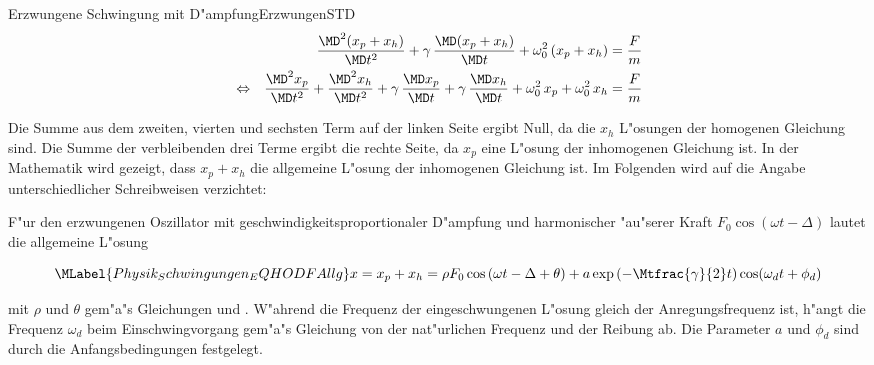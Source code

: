 \begin{MXContent}{Erzwungene Schwingung mit D"ampfung}{Erzwungen}{STD}
\begin{eqnarray}%
  && \frac{\MD^2 (x_p + x_h) }{\MD t^2} + \gamma \, \frac{\MD (x_p + x_h) }{\MD t} + \omega_0^2\,(x_p + x_h) = \frac{F}{m}  \\
  & \Leftrightarrow & \frac{\MD^2 x_p }{\MD t^2} + \frac{\MD^2 x_h }{\MD t^2} 
                    + \gamma \, \frac{\MD x_p }{\MD t} + \gamma \, \frac{\MD x_h }{\MD t} 
                    + \omega_0^2\,x_p + \omega_0^2\,x_h = \frac{F}{m}
\end{eqnarray}

Die Summe aus dem zweiten, vierten und sechsten Term auf der linken Seite ergibt Null, da die $x_h$ L"osungen der homogenen Gleichung sind. Die Summe der verbleibenden drei Terme ergibt die rechte Seite, da $x_p$ eine L"osung der inhomogenen Gleichung ist. In der Mathematik wird gezeigt, dass $x_p + x_h$ die allgemeine L"osung der inhomogenen Gleichung ist. Im Folgenden wird auf die Angabe unterschiedlicher Schreibweisen verzichtet:

\begin{MInfo}
F"ur den erzwungenen Oszillator mit geschwindigkeitsproportionaler D"ampfung und harmonischer "au"serer Kraft $F_0 \cos\left(\omega t - \Delta\right)$ lautet die allgemeine L"osung

\begin{equation}\MLabel{Physik_Schwingungen_EQHODFAllg}
  x = x_p+x_h = \rho F_0 \cos\left(\omega t - \Delta + \theta\right) + a\exp\left(-\Mtfrac{\gamma}{2}t\right)\cos(\omega_d t+\phi_d)
\end{equation}

mit $\rho$ und $\theta$ gem"a"s Gleichungen  und . W"ahrend die Frequenz der eingeschwungenen L"osung gleich der Anregungsfrequenz ist, h"angt die Frequenz $\omega_d$ beim Einschwingvorgang gem"a"s Gleichung  von der nat"urlichen Frequenz und der Reibung ab. Die Parameter $a$ und $\phi_d$ sind durch die Anfangsbedingungen festgelegt.

\end{MInfo}


\end{MXContent}

